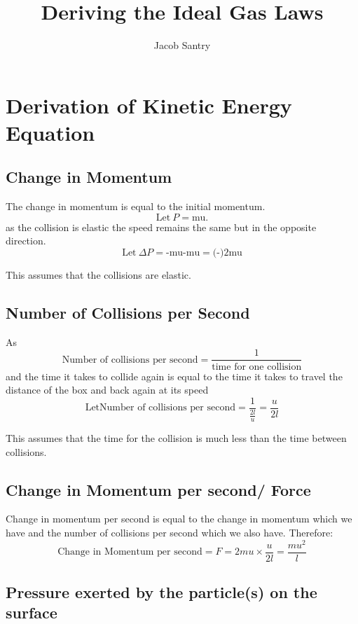 \documentclass[a4paper]{article}
\title{Deriving the Ideal Gas Laws}
\author{Jacob Santry}
\begin{document}
\maketitle


\section{Derivation of Kinetic Energy Equation}

\subsection{Change in Momentum}

The change in momentum is equal to the initial momentum. \[ \text{Let}\ P=\text{mu}. \]
as the collision is elastic the speed remains the same but in the opposite direction.
\[ \text{Let}\ \Delta P=\text{-mu-mu}=\text{(-)2mu} \]

\small *This assumes that the collisions are elastic. \normalsize
\subsection{Number of Collisions per Second}

As \[\text{Number of collisions per second} = \frac{1}{\text{time for one collision}}\]
and the time it takes to collide again is equal to the time it takes to travel the distance of the box and back again at its speed
\[ \text{Let} \text{Number of collisions per second} = \frac{1}{\frac{2l}{u}} = \frac{u}{2l} \]

\small *This assumes that the time for the collision is much less than the time between collisions.\normalsize
\subsection{Change in Momentum per second/ Force}

Change in momentum per second is equal to the change in momentum which we have and the number of collisions per second which we also have. Therefore:
 \[\text{Change in Momentum per second} = F = 2mu \times \frac{u}{2l} = \frac{mu^2}{l}\]

\begin{figure}
\centering
\end{figure}

\subsection{Pressure exerted by the particle(s) on the surface}
\end{document}
